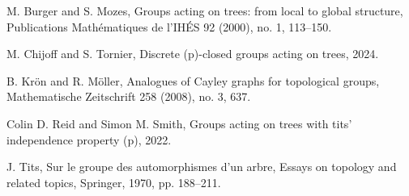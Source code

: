 \documentclass[preview]{standalone}
\begin{document}
\begin{center}
M. Burger and S. Mozes, Groups acting on trees: from local to global structure, Publications Mathématiques de l’IHÉS 92 (2000), no. 1, 113–150.

M. Chijoff and S. Tornier, Discrete (p)-closed groups acting on trees, 2024.

B. Krön and R. Möller, Analogues of Cayley graphs for topological groups, Mathematische Zeitschrift 258 (2008), no. 3, 637.

Colin D. Reid and Simon M. Smith, Groups acting on trees with tits’ independence property (p), 2022.

J. Tits, Sur le groupe des automorphismes d’un arbre, Essays on topology and related topics, Springer, 1970, pp. 188–211.
\end{center}
\end{document}
